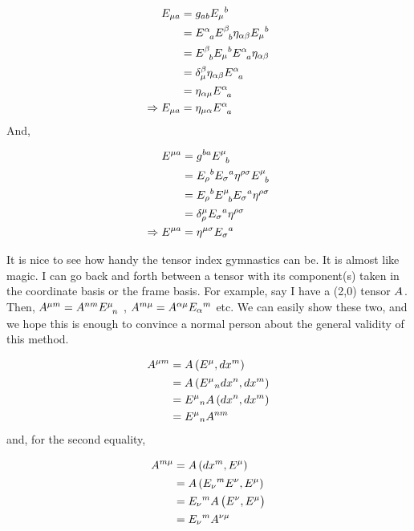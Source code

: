 \begin{align*}
	E_{\mu a} &= g_{ab} \du{E}{\mu}{b} \\
	&= \tt{E}{\alpha}{a} \tt{E}{\beta}{b} \eta_{\alpha\beta} \du{E}{\mu}{b} \\
	&= \tt{E}{\beta}{b} \du{E}{\mu}{b} \tt{E}{\alpha}{a} \eta_{\alpha\beta} \\
	&= \kron{\beta}{\mu} \eta_{\alpha\beta} \tt{E}{\alpha}{a} \\
	&= \eta_{\alpha\mu} \tt{E}{\alpha}{a} \\
	\Rightarrow E_{\mu a}&= \eta_{\mu\alpha} \tt{E}{\alpha}{a}
\end{align*}
And,

\begin{align*}
	E^{\mu a} &= g^{ba} \tt{E}{\mu}{b} \\
	&= \du{E}{\rho}{b} \du{E}{\sigma}{a} \eta^{\rho\sigma} \tt{E}{\mu}{b} \\
	&= \du{E}{\rho}{b} \tt{E}{\mu}{b} \du{E}{\sigma}{a} \eta^{\rho\sigma} \\
	&= \kron{\mu}{\rho} \du{E}{\sigma}{a} \eta^{\rho\sigma} \\
	\Rightarrow E^{\mu a} &= \eta^{\mu\sigma} \du{E}{\sigma}{a}
\end{align*}








It is nice to see how handy the tensor index gymnastics can be. It is almost like magic. I can go back and forth between a tensor with its component(s) taken in the coordinate basis or the frame basis. For example, say I have a (2,0) tensor $\tt{A}{}{}$. Then, $ \tt{A}{ \mu m}{}= \tt{A}{nm}{} \tt{E}{\mu}{n}$ , $\tt{A}{m \mu}{}= \tt{A}{ \alpha \mu}{} E_\alpha{}^m$ etc. We can easily show these two, and we hope this is enough to convince a normal person about the general validity of this method. 

\begin{align*}
    \tt{A}{\mu m }{} &= A \lera{E^\mu, dx^m} \\
    &= A \lera{E^\mu{}_n dx^n, dx^m} \\
    &= E^\mu{}_n A \lera{dx^n, dx^m} \\
    &= E^\mu{}_n A^{nm} \\
\end{align*}
and, for the second equality,

\begin{align*}
    \tt{A}{m \mu}{} &= A \lera{dx^m, E^\mu} \\
    &= A \lera{E_\nu{}^m E^\nu, E^\mu} \\
    &= E_\nu{}^m A \lera{ \tt{E}{ \nu}{}, \tt{E}{ \mu}{} } \\
    &= E_\nu{}^m \tt{A}{ \nu \mu}{}
\end{align*}







